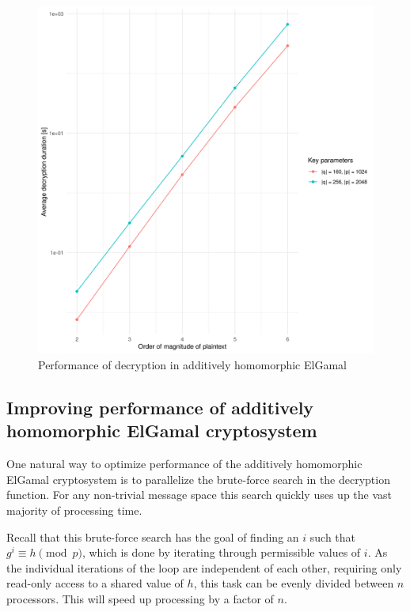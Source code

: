 \documentclass[a4paper]{scrreprt}
\begin{document}
\begin{figure}[h]
        \centering
		\includegraphics[width=\textwidth]{elgamal_performance}
		\caption{Performance of decryption in additively homomorphic ElGamal}
		\label{fig:performance}
\end{figure}

\subsection{Improving performance of additively homomorphic ElGamal cryptosystem}

One natural way to optimize performance of the additively homomorphic ElGamal
cryptosystem is to parallelize the brute-force search in the decryption
function. For any non-trivial message space this search quickly uses up the
vast majority of processing time.

Recall that this brute-force search has the goal of finding an $i$ such that
$g^i \equiv h \pmod{p}$, which is done by iterating through permissible values
of $i$. As the individual iterations of the loop are independent of each other,
requiring only read-only access to a shared value of $h$, this task can be
evenly divided between $n$ processors. This will speed up processing by a
factor of $n$.

\end{document}
